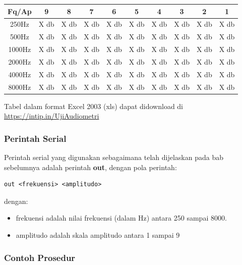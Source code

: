 \documentclass[12pt,]{article}
\begin{document}
	\begin{center}
		\begin{tabular}{|c|c|c|c|c|c|c|c|c|c|} 
			\hline
			Fq/Ap & 9 & 8 & 7 & 6 & 5 & 4 & 3 & 2 & 1\\ [0.5ex] 
			\hline\hline
			250Hz & X db & X db & X db & X db & X db & X db & X db & X db & X db\\
			\hline
			500Hz & X db & X db & X db & X db & X db & X db & X db & X db & X db\\
			\hline
			1000Hz & X db & X db & X db & X db & X db & X db & X db & X db & X db\\
			\hline
			2000Hz & X db & X db & X db & X db & X db & X db & X db & X db & X db\\
			\hline
			4000Hz & X db & X db & X db & X db & X db & X db & X db & X db & X db\\
			\hline
			8000Hz & X db & X db & X db & X db & X db & X db & X db & X db & X db\\
			\hline
		\end{tabular}
	\end{center}
	
	Tabel dalam format Excel 2003 (xls) dapat didownload di \url{https://intip.in/UjiAudiometri}
	
	\subsubsection{Perintah Serial}
	
	Perintah serial yang digunakan sebagaimana telah dijelaskan pada bab sebelumnya adalah perintah \textbf{out},
	dengan pola perintah:
	\begin{verbatim}
out <frekuensi> <amplitudo>
	\end{verbatim}
	dengan:
	\begin{itemize}
		\item frekuensi adalah nilai frekuensi (dalam Hz) antara 250 sampai 8000.
		\item amplitudo adalah skala amplitudo antara 1 sampai 9
	\end{itemize}

	\newpage
	\subsubsection{Contoh Prosedur}
	
\end{document}
